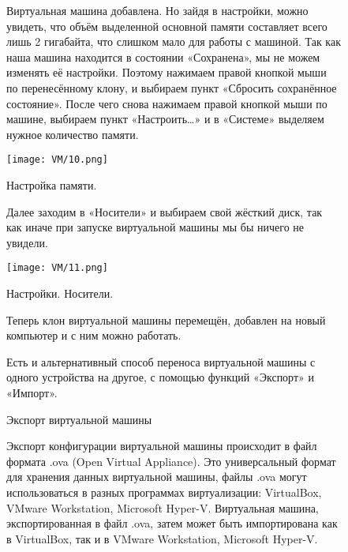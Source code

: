 \begin{figure}
\quad Виртуальная машина добавлена. Но зайдя в настройки, можно увидеть, что объём выделенной основной памяти составляет всего лишь 2 гигабайта, что слишком мало для работы с машиной. Так как наша машина находится в состоянии «Сохранена», мы не можем изменять её настройки. Поэтому нажимаем правой кнопкой мыши по перенесённому клону, и выбираем пункт «Сбросить сохранённое состояние». После чего снова нажимаем правой кнопкой мыши по машине, выбираем пункт «Настроить…» и в «Системе» выделяем нужное количество памяти.

		\centering
		\texttt{[image: VM/10.png]}
\caption{Настройка памяти.}
\label{ris:image}
\end{figure}

\begin{figure}
\quad Далее заходим в «Носители» и выбираем свой жёсткий диск, так как иначе при запуске виртуальной машины мы бы ничего не увидели.

		\centering
		\texttt{[image: VM/11.png]}
\caption{Настройки. Носители.}
\label{ris:image}

\end{figure}

\begin{figure}
\quad Теперь клон виртуальной машины перемещён, добавлен на новый компьютер и с ним можно работать.
\end{figure}

\begin{figure}
\quad Есть и альтернативный способ переноса виртуальной машины с одного устройства на другое, с помощью функций «Экспорт» и «Импорт».
\end{figure}

\begin{figure}
\centering
Экспорт виртуальной машины
\label{ris:image}
\end{figure}

\begin{figure}
\quad Экспорт конфигурации виртуальной машины происходит в файл формата .ova (Open Virtual Appliance). Это универсальный формат для хранения данных виртуальной машины, файлы .ova могут использоваться в разных программах виртуализации: VirtualBox, VMware Workstation, Microsoft Hyper-V. Виртуальная машина, экспортированная в файл .ova, затем может быть импортирована как в VirtualBox, так и в VMware Workstation, Microsoft Hyper-V.
\end{figure}

